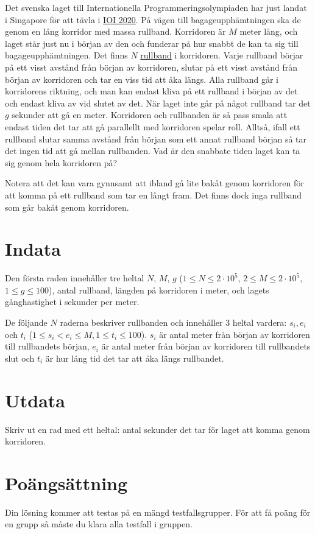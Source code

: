 Det svenska laget till Internationella Programmeringsolympiaden har just landat i Singapore för att
tävla i \href{https://ioi2020.sg/}{IOI 2020}.
På vägen till bagageupphämtningen ska de genom en lång korridor med massa rullband.
Korridoren är $M$ meter lång, och laget står just nu i början av den och funderar på
hur snabbt de kan ta sig till bagageupphämtningen.
Det finns $N$ \href{https://sv.wikipedia.org/wiki/Rullande_trottoar}{rullband} i korridoren.
Varje rullband börjar på ett visst avstånd från början av korridoren,
slutar på ett visst avstånd från början av korridoren och tar en viss tid att åka längs.
Alla rullband går i korridorens riktning, och man kan endast kliva på ett rullband i början av det och endast kliva av vid slutet av det.
När laget inte går på något rullband tar det $g$ sekunder att gå en meter.
Korridoren och rullbanden är så pass smala att endast tiden det tar att gå
parallellt med korridoren spelar roll. 
Alltså, ifall ett rullband slutar samma avstånd från början
som ett annat rullband början så tar det ingen tid att gå mellan
rullbanden. Vad är den snabbate tiden laget kan ta sig genom hela korridoren på?

Notera att det kan vara gynnsamt att ibland gå lite bakåt genom korridoren för att komma på
ett rullband som tar en långt fram. Det finns dock inga rullband som går bakåt genom
korridoren.

\section*{Indata}
Den första raden innehåller tre heltal $N$, $M$, $g$ ($1 \le N \le 2 \cdot 10^5$, $2 \le M \le 2 \cdot 10^5$, $1 \le g \le 100$),
antal rullband, längden på korridoren i meter, och lagets gånghastighet i sekunder per meter.

De följande $N$ raderna beskriver rullbanden och innehåller 3 heltal vardera: $s_i, e_i$ och $t_i$
($1\leq s_i < e_i\leq M,1\leq t_i\leq100$).
$s_i$ är antal meter från början av korridoren till rullbandets början, $e_i$ är antal meter
från början av korridoren till rullbandets slut och $t_i$ är hur lång tid det tar att åka längs rullbandet.

\section*{Utdata}
Skriv ut en rad med ett heltal: antal sekunder det tar för laget att komma genom korridoren.

\section*{Poängsättning}
Din lösning kommer att testas på en mängd testfallsgrupper.
För att få poäng för en grupp så måste du klara alla testfall i gruppen.

